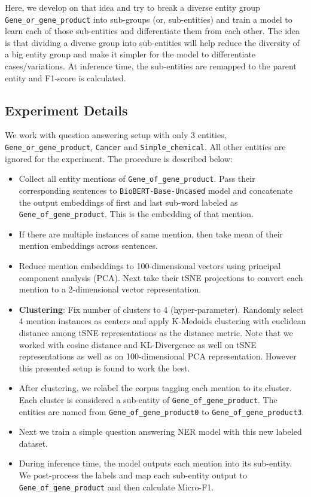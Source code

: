 Here, we develop on that idea and try to break a diverse entity group \texttt{Gene\_or\_gene\_product} into sub-groups (or, sub-entities) and train a model to learn each of those sub-entities and differentiate them from each other. The idea is that dividing a diverse group into sub-entities will help reduce the diversity of a big entity group and make it simpler for the model to differentiate cases/variations. At inference time, the sub-entities are remapped to the parent entity and F1-score is calculated.

\subsection{Experiment Details}
We work with question answering setup with only 3 entities, \texttt{Gene\_or\_gene\_product}, \texttt{Cancer} and \texttt{Simple\_chemical}. All other entities are ignored for the experiment. The procedure is described below:

\begin{itemize}
    \item Collect all entity mentions of \texttt{Gene\_of\_gene\_product}. Pass their corresponding sentences to \texttt{BioBERT-Base-Uncased} model and concatenate the output embeddings of first and last sub-word labeled as \texttt{Gene\_of\_gene\_product}. This is the embedding of that mention.
    
    \item If there are multiple instances of same mention, then take mean of their mention embeddings across sentences.
    
    \item Reduce mention embeddings to 100-dimensional vectors using principal component analysis (PCA). Next take their tSNE\cite{} projections to convert each mention to a 2-dimensional vector representation.
    
    \item \textbf{Clustering}: Fix number of clusters to 4 (hyper-parameter). Randomly select 4 mention instances as centers and apply K-Medoids clustering with euclidean distance among tSNE representations as the distance metric. Note that we worked with cosine distance and KL-Divergence as well on tSNE representations as well as on 100-dimensional PCA representation. However this presented setup is found to work the best.
    
    \item After clustering, we relabel the corpus tagging each mention to its cluster. Each cluster is considered a sub-entity of \texttt{Gene\_of\_gene\_product}. The entities are named from \texttt{Gene\_of\_gene\_product0} to \texttt{Gene\_of\_gene\_product3}.
    
    \item Next we train a simple question answering NER model with this new labeled dataset. 
    
    \item During inference time, the model outputs each mention into its sub-entity. We post-process the labels and map each sub-entity output to \texttt{Gene\_of\_gene\_product} and then calculate Micro-F1.
\end{itemize}

